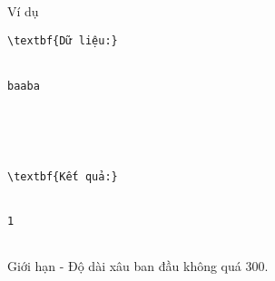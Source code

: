 Ví dụ
\begin{verbatim}
\textbf{Dữ liệu:}


baaba





\textbf{Kết quả:}


1


\end{verbatim}
Giới hạn
- Độ dài xâu ban đầu không quá 300.